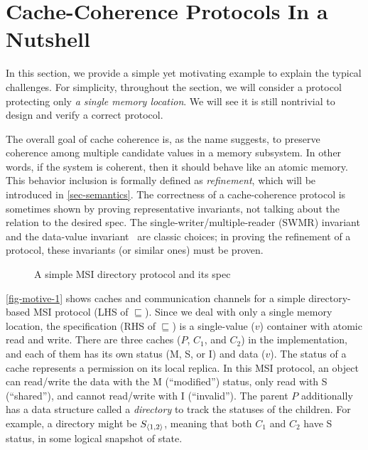 \section{Cache-Coherence Protocols In a Nutshell}
\label{sec-nutshell}

In this section, we provide a simple yet motivating example to explain the typical challenges.
For simplicity, throughout the section, we will consider a protocol protecting only \emph{a single memory location}.
We will see it is still nontrivial to design and verify a correct protocol.

The overall goal of cache coherence is, as the name suggests, to preserve coherence among multiple candidate values in a memory subsystem.
In other words, if the system is coherent, then it should behave like an atomic memory.
This behavior inclusion is formally defined as \emph{refinement}, which will be introduced in \autoref{sec-semantics}.
The correctness of a cache-coherence protocol is sometimes shown by proving representative invariants, not talking about the relation to the desired spec.
The single-writer/multiple-reader (SWMR) invariant and the data-value invariant~\cite{ccbook:2020} are classic choices; in proving the refinement of a protocol, these invariants (or similar ones) must be proven.

\begin{figure}[t]
  \centering
  \caption{A simple MSI directory protocol and its spec}
  \label{fig-motive-1}
\end{figure}

\autoref{fig-motive-1} shows caches and communication channels for a simple directory-based MSI protocol (LHS of $\sqsubseteq$).
Since we deal with only a single memory location, the specification (RHS of $\sqsubseteq$) is a single-value ($v$) container with atomic read and write.
There are three caches ($P$, $C_1$, and $C_2$) in the implementation, and each of them has its own status (M, S, or I) and data ($v$).
The status of a cache represents a permission on its local replica.
In this MSI protocol, an object can read/write the data with the M (``modified'') status, only read with S (``shared''), and cannot read/write with I (``invalid'').
The parent $P$ additionally has a data structure called a \emph{directory} to track the statuses of the children.
For example, a directory might be $S_{\langle 1, 2 \rangle}$, meaning that both $C_1$ and $C_2$ have S status, in some logical snapshot of state.

